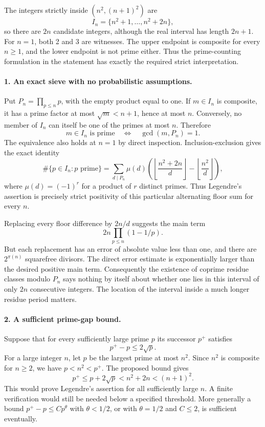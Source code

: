 \documentclass[11pt]{article}
\begin{document}
The integers strictly inside $(n^2,(n+1)^2)$ are
\[
 I_n=\{n^2+1,\ldots,n^2+2n\},
\]
so there are $2n$ candidate integers, although the real interval has length $2n+1$. For $n=1$, both 2 and 3 are witnesses. The upper endpoint is composite for every $n\ge1$, and the lower endpoint is not prime either. Thus the prime-counting formulation in the statement has exactly the required strict interpretation.

\paragraph{1. An exact sieve with no probabilistic assumptions.}
Put $P_n=\prod_{p\le n}p$, with the empty product equal to one. If $m\in I_n$ is composite, it has a prime factor at most $\sqrt m<n+1$, hence at most $n$. Conversely, no member of $I_n$ can itself be one of the primes at most $n$. Therefore
\[
 m\in I_n\text{ is prime}\quad\Longleftrightarrow\quad
 \gcd(m,P_n)=1.
\]
The equivalence also holds at $n=1$ by direct inspection. Inclusion-exclusion gives the exact identity
\[
 \#\{p\in I_n:p\text{ prime}\}
 =\sum_{d\mid P_n}\mu(d)
 \left(\left\lfloor\frac{n^2+2n}{d}\right\rfloor
       -\left\lfloor\frac{n^2}{d}\right\rfloor\right),
\]
where $\mu(d)=(-1)^r$ for a product of $r$ distinct primes. Thus Legendre's assertion is precisely strict positivity of this particular alternating floor sum for every $n$.

Replacing every floor difference by $2n/d$ suggests the main term
\[
 2n\prod_{p\le n}(1-1/p).
\]
But each replacement has an error of absolute value less than one, and there are $2^{\pi(n)}$ squarefree divisors. The direct error estimate is exponentially larger than the desired positive main term. Consequently the existence of coprime residue classes modulo $P_n$ says nothing by itself about whether one lies in this interval of only $2n$ consecutive integers. The location of the interval inside a much longer residue period matters.

\paragraph{2. A sufficient prime-gap bound.}
Suppose that for every sufficiently large prime $p$ its successor $p^+$ satisfies
\[
 p^+-p\le2\sqrt p.
\]
For a large integer $n$, let $p$ be the largest prime at most $n^2$. Since $n^2$ is composite for $n\ge2$, we have $p<n^2<p^+$. The proposed bound gives
\[
 p^+\le p+2\sqrt p<n^2+2n<(n+1)^2.
\]
This would prove Legendre's assertion for all sufficiently large $n$. A finite verification would still be needed below a specified threshold. More generally a bound $p^+-p\le C p^\theta$ with $\theta<1/2$, or with $\theta=1/2$ and $C\le2$, is sufficient eventually.
\end{document}
